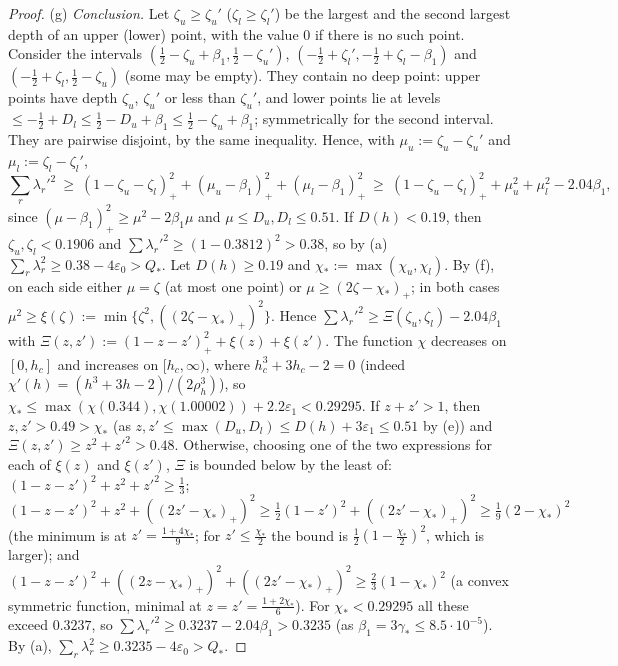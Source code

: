 \documentclass[11pt]{amsart}
\theoremstyle{definition}
\theoremstyle{remark}
\begin{document}
\begin{proof}
(g) \emph{Conclusion.} Let $\zeta_u\ge\zeta_u'$ ($\zeta_l\ge\zeta_l'$) be the largest and the second largest depth of an upper (lower)
point, with the value $0$ if there is no such point. Consider the intervals $(\frac12-\zeta_u+\beta_1,\frac12-\zeta_u')$,
$(-\frac12+\zeta_l',-\frac12+\zeta_l-\beta_1)$ and $(-\frac12+\zeta_l,\frac12-\zeta_u)$ (some may be empty). They contain no deep point: upper
points have depth $\zeta_u$, $\zeta_u'$ or less than $\zeta_u'$, and lower points lie at levels $\le-\frac12+D_l\le\frac12-D_u+\beta_1\le
\frac12-\zeta_u+\beta_1$; symmetrically for the second interval. They are pairwise disjoint, by the same inequality. Hence, with
$\mu_u:=\zeta_u-\zeta_u'$ and $\mu_l:=\zeta_l-\zeta_l'$,
\[
\sum_r\lambda_r'^2\ \ge\ (1-\zeta_u-\zeta_l)_+^2+(\mu_u-\beta_1)_+^2+(\mu_l-\beta_1)_+^2\ \ge\ (1-\zeta_u-\zeta_l)_+^2+\mu_u^2+\mu_l^2-2.04\beta_1,
\]
since $(\mu-\beta_1)_+^2\ge\mu^2-2\beta_1\mu$ and $\mu\le D_u,D_l\le0.51$. If $D(h)<0.19$, then $\zeta_u,\zeta_l<0.1906$ and
$\sum\lambda_r'^2\ge(1-0.3812)^2>0.38$, so by (a) $\sum_r\lambda_r^2\ge0.38-4\varepsilon_0>Q_*$. Let $D(h)\ge0.19$ and $\chi_*:=\max(\chi_u,\chi_l)$. By (f), on each side either $\mu=\zeta$ (at
most one point) or $\mu\ge(2\zeta-\chi_*)_+$; in both cases $\mu^2\ge\xi(\zeta):=\min\{\zeta^2,((2\zeta-\chi_*)_+)^2\}$. Hence
$\sum\lambda_r'^2\ge\Xi(\zeta_u,\zeta_l)-2.04\beta_1$ with $\Xi(z,z'):=(1-z-z')_+^2+\xi(z)+\xi(z')$. The function $\chi$ decreases on
$[0,h_c]$ and increases on $[h_c,\infty)$, where $h_c^3+3h_c-2=0$ (indeed $\chi'(h)=(h^3+3h-2)/(2\rho_h^3)$), so
$\chi_*\le\max(\chi(0.344),\chi(1.00002))+2.2\varepsilon_1<0.29295$. If $z+z'>1$, then $z,z'>0.49>\chi_*$ (as $z,z'\le\max(D_u,D_l)\le D(h)+3\varepsilon_1\le0.51$ by (e)) and $\Xi(z,z')\ge z^2+z'^2>0.48$.
Otherwise, choosing one of the two expressions for each of $\xi(z)$ and $\xi(z')$, $\Xi$ is bounded below by the least of:
$(1-z-z')^2+z^2+z'^2\ge\frac13$; $(1-z-z')^2+z^2+((2z'-\chi_*)_+)^2\ge\frac12(1-z')^2+((2z'-\chi_*)_+)^2\ge\frac19(2-\chi_*)^2$ (the
minimum is at $z'=\frac{1+4\chi_*}9$; for $z'\le\frac{\chi_*}2$ the bound is $\frac12(1-\frac{\chi_*}2)^2$, which is larger); and
$(1-z-z')^2+((2z-\chi_*)_+)^2+((2z'-\chi_*)_+)^2\ge\frac23(1-\chi_*)^2$ (a convex symmetric function, minimal at $z=z'=\frac{1+2\chi_*}6$).
For $\chi_*<0.29295$ all these exceed $0.3237$, so $\sum\lambda_r'^2\ge0.3237-2.04\beta_1>0.3235$ (as $\beta_1=3\gamma_*\le8.5\cdot10^{-5}$). By (a),
$\sum_r\lambda_r^2\ge0.3235-4\varepsilon_0>Q_*$.
\end{proof}
\end{document}
